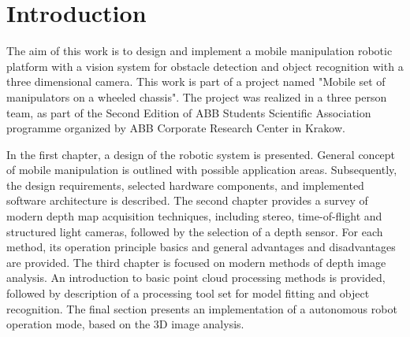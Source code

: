 \chapter*{Introduction}
\label{cha:introduction}



The aim of this work is to design and implement a mobile manipulation robotic platform with a vision system for obstacle detection and object recognition with a three dimensional camera. This work is part of a project named "Mobile set of manipulators on a wheeled chassis". The project was realized in a three person team, as part of the Second Edition of ABB Students Scientific Association programme organized by ABB Corporate Research Center in Krakow.

	In the first chapter, a design of the robotic system is presented. General concept of mobile manipulation is outlined with possible application areas. Subsequently, the design requirements, selected hardware components, and implemented software architecture is described. The second chapter provides a survey of modern depth map acquisition techniques, including stereo, time-of-flight and structured light cameras, followed by the selection of a depth sensor. For each method, its operation principle basics and general advantages and disadvantages are provided. The third chapter is focused on modern methods of depth image analysis. An introduction to basic point cloud processing methods is provided, followed by description of a processing tool set for model fitting and object recognition. The final section presents an implementation of a autonomous robot operation mode, based on the 3D image analysis. 
	
	
\begin{comment}

Tematem pracy jest opis wybranych elementów składowych projektu o nazwie: Mobilny zespół manipulatorów na wspólnej platformie jezdnej. Projekt ten zrealizowany został w ramach Drugiej Edycji Koła Naukowego ABB we współpracy z Korporacyjnym Centrum Badawczym ABB w Krakowie. Zespół projektowy składał się z trzech osób pomiędzy które zostały podzielone zadania. Na tej podstawie zrealizowane zostały trzy prace dyplomowe inżynierskie. Niniejsza, związana z projektem mechanicznym, samodzielnym montażem wszystkich podzespołów oraz z analizą zagadnień kinematycznych zespołu dwóch skonstruowanych manipulatorów oraz dwie inne prace związane z oprogramowaniem operatorskim oraz z systemem akwizycji i przetwarzania danych. Projekt był realizowany w okresie od marca do listopada 2014 roku i jego główną częścią było uruchomienie zbudowanego urządzenia i jego prezentacja podczas uroczystego podsumowania.

\end{comment}









